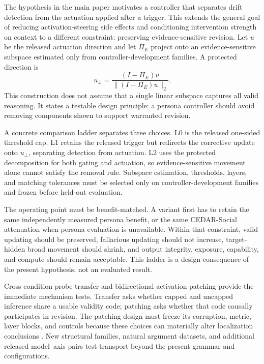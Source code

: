 \documentclass[letterpaper]{article}
\begin{document}
The hypothesis in the main paper motivates a controller that separates drift detection from the actuation applied after a trigger.  This extends the general goal of reducing activation-steering side effects and conditioning intervention strength on context \citep{stickland2024steering,lee2025programming} to a different constraint: preserving evidence-sensitive revision.  Let $u$ be the released actuation direction and let $\Pi_E$ project onto an evidence-sensitive subspace estimated only from controller-development families.  A protected direction is
\begin{equation}
u_{\perp}=\frac{(I-\Pi_E)u}{\lVert(I-\Pi_E)u\rVert_2}.
\end{equation}
This construction does not assume that a single linear subspace captures all valid reasoning.  It states a testable design principle: a persona controller should avoid removing components shown to support warranted revision.

A concrete comparison ladder separates three choices.  L0 is the released one-sided threshold cap.  L1 retains the released trigger but redirects the corrective update onto $u_{\perp}$, separating detection from actuation.  L2 uses the protected decomposition for both gating and actuation, so evidence-sensitive movement alone cannot satisfy the removal rule.  Subspace estimation, thresholds, layers, and matching tolerances must be selected only on controller-development families and frozen before held-out evaluation.

The operating point must be benefit-matched.  A variant first has to retain the same independently measured persona benefit, or the same CEDAR-Social attenuation when persona evaluation is unavailable.  Within that constraint, valid updating should be preserved, fallacious updating should not increase, target-hidden broad movement should shrink, and output integrity, exposure, capability, and compute should remain acceptable.  This ladder is a design consequence of the present hypothesis, not an evaluated result.

Cross-condition probe transfer and bidirectional activation patching provide the immediate mechanism tests.  Transfer asks whether capped and uncapped inference share a usable validity code; patching asks whether that code causally participates in revision.   The patching design must freeze its corruption, metric, layer blocks, and controls because these choices can materially alter localization conclusions \citep{zhang2023patching}.  New structural families, natural argument datasets, and additional released model--axis pairs test transport beyond the present grammar and configurations.
\end{document}
